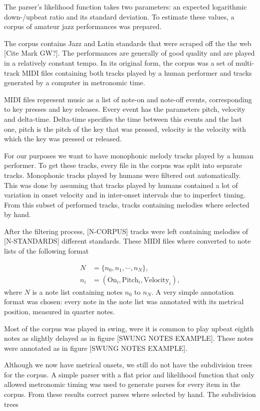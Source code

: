 The parser's likelihood function takes two parameters: an expected logarithmic down-/upbeat ratio and its standard deviation. To estimate these values, a corpus of amateur jazz performances was prepared.

The corpus contains Jazz and Latin standards that were scraped off the the web [Cite Mark GW?]. The performances are generally of good quality and are played in a relatively constant tempo. In its original form, the corpus was a set of multi-track MIDI files containing both tracks played by a human performer and tracks generated by a computer in metronomic time.

MIDI files represent music as a list of note-on and note-off events, corresponding to key presses and key releases. Every event has the parameters pitch, velocity and delta-time. Delta-time specifies the time between this events and the last one, pitch is the pitch of the key that was pressed, velocity is the velocity with which the key was pressed or released.

For our purposes we want to have monophonic melody tracks played by a human performer. To get these tracks, every file in the corpus was split into separate tracks. Monophonic tracks played by humans were filtered out automatically. This was done by assuming that tracks played by humans contained a lot of variation in onset velocity and in inter-onset intervals due to imperfect timing. From this subset of performed tracks, tracks containing melodies where selected by hand. 

After the filtering process, [N-CORPUS] tracks were left containing melodies of [N-STANDARDS] different standards. These MIDI files where converted to note lists of the following format

\begin{align*}
N &= \{n_0, n_1, \cdots, n_N\},\\
n_i &= (\mathrm{On}_i, \mathrm{Pitch}_i, \mathrm{Velocity}_i),
\end{align*}
where $N$ is a note list containing notes $n_0$ to $n_N$. A very simple annotation format was chosen: every note in the note list was annotated with its metrical position, measured in quarter notes. 

Most of the corpus was played in swing, were it is common to play upbeat eighth notes as slightly delayed as in figure [SWUNG NOTES EXAMPLE]. These notes were annotated as in figure [SWUNG NOTES EXAMPLE]. 

Although we now have metrical onsets, we still do not have the subdivision trees for the corpus. A simple parser with a flat prior and likelihood function that only allowed metronomic timing was used to generate parses for every item in the corpus. From these results correct parses where selected by hand. The subdivision trees 


